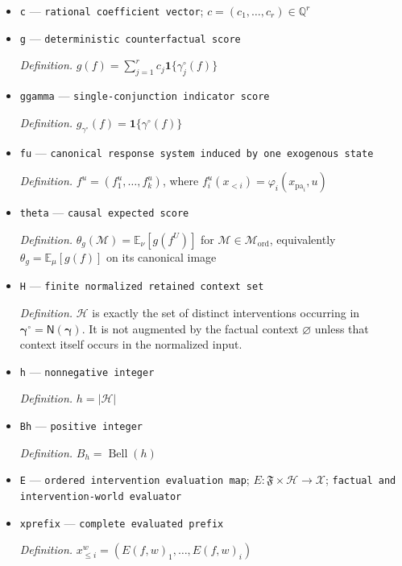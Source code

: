 \documentclass{article}
\begin{document}
\begin{itemize}
  \item \texttt{c} --- \texttt{rational coefficient vector}; \(c=(c_1,\ldots,c_r)\in\mathbb Q^r\)
  \item \texttt{g} --- \texttt{deterministic counterfactual score}
  \par\smallskip\noindent\emph{Definition.} \(g(f)=\sum_{j=1}^r c_j\mathbf 1\{\gamma_j^{\circ}(f)\}\)
  \item \texttt{ggamma} --- \texttt{single-\allowbreak{}conjunction indicator score}
  \par\smallskip\noindent\emph{Definition.} \(g_{\gamma^{\circ}}(f)=\mathbf 1\{\gamma^{\circ}(f)\}\)
  \item \texttt{fu} --- \texttt{canonical response system induced by one exogenous state}
  \par\smallskip\noindent\emph{Definition.} \(f^u=(f_1^u,\ldots,f_k^u)\), where \(f_i^u(x_{<i})=\varphi_i(x_{\operatorname{pa}_i},u)\)
  \item \texttt{theta} --- \texttt{causal expected score}
  \par\smallskip\noindent\emph{Definition.} \(\theta_g(\mathcal M)=\mathbb E_{\nu}[g(f^U)]\) for \(\mathcal M\in\mathcal M_{\mathrm{ord}}\), equivalently \(\theta_g=\mathbb E_{\mu}[g(f)]\) on its canonical image
  \item \texttt{H} --- \texttt{finite normalized retained context set}
  \par\smallskip\noindent\emph{Definition.} \(\mathcal H\) is exactly the set of distinct interventions occurring in \(\boldsymbol\gamma^{\circ}=\mathsf N(\boldsymbol\gamma)\). It is not augmented by the factual context \(\varnothing\) unless that context itself occurs in the normalized input.
  \item \texttt{h} --- \texttt{nonnegative integer}
  \par\smallskip\noindent\emph{Definition.} \(h=|\mathcal H|\)
  \item \texttt{Bh} --- \texttt{positive integer}
  \par\smallskip\noindent\emph{Definition.} \(B_h=\operatorname{Bell}(h)\)
  \item \texttt{E} --- \texttt{ordered intervention evaluation map}; \(E:\mathfrak F\times\mathcal H\to\mathcal X\); \texttt{factual and intervention-\allowbreak{}world evaluator}
  \item \texttt{xprefix} --- \texttt{complete evaluated prefix}
  \par\smallskip\noindent\emph{Definition.} \(x^w_{\le i}=(E(f,w)_1,\ldots,E(f,w)_i)\)

\end{itemize}
\end{document}
